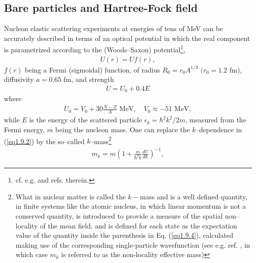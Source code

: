 \subsection{Bare particles and Hartree-Fock field}\label{S1.9.1}
Nucleon elastic scattering experiments at energies of tens of MeV can be accurately described in terms of an optical potential in which the real component is parametrized according to the (Woods--Saxon) potential\footnote{cf. e.g. \cite{Bohr:69} and refs. therein.},
\begin{align}
U(r)=Uf(r),
\end{align}
$f(r)$ being a Fermi (sigmoidal) function, of radius $R_0=r_0A^{1/3}$ $(r_0=1.2$ fm), diffusivity $a=0.65$ fm, and strength 
\begin{align}\label{eq1.9.2}
U=U_0+0.4 E
\end{align}
where 
\begin{align}\label{eq1.9.3}
U_0=V_0+30\frac{N-Z}{A}\text{ MeV},\quad V_0\approx-51\text{ MeV},
\end{align}
while $E$ is the energy of the scattered particle $\epsilon_k=\hbar^2k^2/2m$, measured from the Fermi energy, $m$ being the nucleon mass. One can replace the $k$--dependence in (\ref{eq1.9.2}) by the so--called $k$--mass\footnote{What in nuclear matter is called the $k-$mass  and is a well defined quantity, in finite systems like the atomic nucleus, in which linear momentum is not
a conserved quantity,  is introduced to provide a measure of the spatial non--locality of the mean field, and is defined for each state 
as the expectation value of the quantity inside the parenthesis in Eq. (\ref{eq1.9.4}), calculated making use of the corresponding single-particle wavefunction 
(see e.g. ref. \cite{Bernard:81}, in which case $m_k$ is referred to as the non-locality effective mass)}
\begin{align}\label{eq1.9.4}
m_k=m\left(1+\frac{m}{\hbar^2k}\frac{dU}{dk}\right)^{-1},
\end{align}
